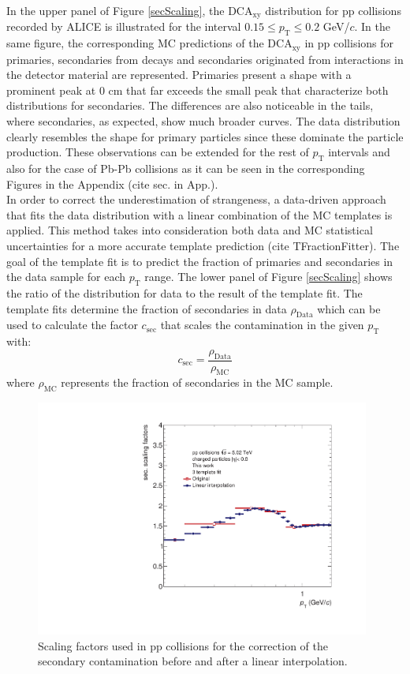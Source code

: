 \documentclass[12pt,a4paper]{report}
\begin{document}
In the upper panel of Figure \ref{secScaling}, the DCA$_{\text{xy}}$ distribution for pp collisions recorded by ALICE is illustrated for the \pt interval $0.15 \leq p_\text{T} \leq 0.2 $ GeV/$c$. In the same figure, the corresponding MC predictions of the DCA$_{\text{xy}}$ in pp collisions for primaries, secondaries from decays and secondaries originated from interactions in the detector material are represented. Primaries present a shape with a prominent peak at $0$ cm that far exceeds the small peak that characterize both distributions for secondaries. The differences are also noticeable in the tails, where secondaries, as expected, show much broader curves. The data distribution clearly resembles the shape for primary particles since these dominate the particle production. These observations can be extended for the rest of $p_\text{T}$ intervals and also for the case of Pb-Pb collisions as it can be seen in the corresponding Figures in the Appendix (cite sec. in App.). \\
In order to correct the underestimation of strangeness, a data-driven approach that fits the data distribution with a linear combination of the MC templates is applied. This method takes into consideration both data and MC statistical uncertainties for a more accurate template prediction (cite TFractionFitter). The goal of the template fit is to predict the fraction of primaries and secondaries in the data sample for each $p_\text{T}$ range. The lower panel of Figure \ref{secScaling} shows the ratio of the distribution for data to the result of the template fit. The template fits determine the fraction of secondaries in data $\rho_\text{Data}$ which can be used to calculate the factor $c_\text{sec}$ that scales the contamination in the given $p_\text{T}$ with:
\begin{equation}
c_\text{sec} = \dfrac{\rho_\text{Data}}{\rho_\text{MC}}
\end{equation}
where $\rho_\text{MC}$ represents the fraction of secondaries in the MC sample. 
\begin{figure}[tb!]
\centering
\includegraphics[width=11cm]{Plots/secscalingfactors.pdf}  
\caption{Scaling factors used in pp collisions for the correction of the secondary contamination before and after a linear interpolation.}
\label{scalefactors} 
\end{figure}
\end{document}
